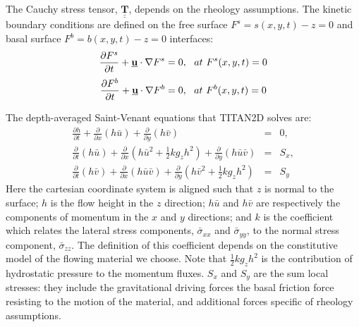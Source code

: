 \documentclass{article}
\def\dt{\partial t}
\begin{document}
The Cauchy stress tensor, $\underline{\underline{{\mathbf{T}}}}$, depends on the rheology assumptions. The kinetic boundary conditions are defined on the free surface $F^s=s(x,y,t)-z=0$ and basal surface $F^b=b(x,y,t)-z=0$ interfaces:
\begin{equation}\label{eq:SurKinBC}
\frac{\partial F^s}{\dt} + \underline{{\textbf u}}\cdot\nabla F^s = 0, \ \ at \ F^s(x,y,t)=0
\end{equation}
\begin{equation}\label{eq:BedKinBC}
\frac{\partial F^b}{\dt} + \underline{{\textbf u}}\cdot\nabla F^b = 0, \ \ at \ F^b(x,y,t)=0
\end{equation}

The depth-averaged Saint-Venant equations that TITAN2D solves are:
\begin{eqnarray}
\label{eq:D_A}
\frac{\partial h}{\partial t} +
\frac{\partial}{\partial x}(h \bar{u}) +
\frac{\partial}{\partial y}(h\bar{v}) &=& 0, \nonumber \\
\frac{\partial}{\partial t} (h\bar{u}) +
\frac{\partial}{\partial x}\left(h\bar{u}^2 + \frac{1}{2}k g_{z}h^2\right) + \frac{\partial}{\partial y}(h\bar{u}\bar{v}) &=& S_{x},\\
\frac{\partial}{\partial t} (h\bar{v}) +
\frac{\partial}{\partial x}(h\bar{u}\bar{v}) +
\frac{\partial}{\partial y}\left(h\bar{v}^2 + \frac{1}{2}k g_{z}h^2\right) &=& S_{y}\nonumber
\end{eqnarray}
Here the cartesian coordinate system is aligned such that $z$ is normal to the surface; $h$ is the flow height in the $z$ direction; $h\bar{u}$ and $h\bar{v}$ are respectively the components of momentum in the $x$ and $y$ directions; and $k$ is the coefficient which relates the lateral stress components, $\bar{\sigma}_{xx}$ and $\bar{\sigma}_{yy}$, to the normal stress component, $\bar{\sigma}_{zz}$. The definition of this coefficient depends on the constitutive model of the flowing material we choose. Note that $\frac{1}{2} k g_z h^2$ is the contribution of hydrostatic pressure to the momentum fluxes. $S_x$ and $S_y$ are the sum local stresses: they include the gravitational driving forces the basal friction force resisting to the motion of the material, and additional forces specific of rheology assumptions.
\end{document}

